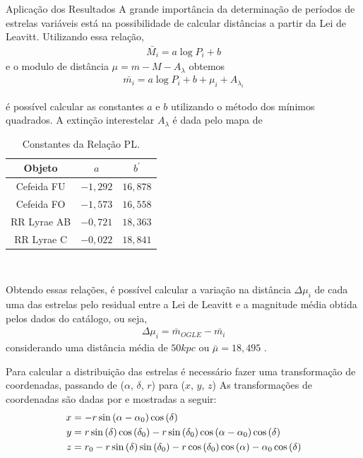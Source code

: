 \documentclass{beamer}
\begin{document}
\begin{frame}[allowframebreaks]{Aplicação dos Resultados}
A grande importância da determinação de períodos de estrelas variáveis está na possibilidade de calcular distâncias a partir da Lei de Leavitt. Utilizando essa relação,
\begin{align}
\bar{M_i} = a \log P_i + b
\end{align}
e o modulo de distância $\mu = m - M - A_\lambda$ obtemos
\begin{align}
\bar{m_i} = a \log P_i + b + \mu_i + A_{\lambda_i} \label{eq:cap4_pl}
\end{align}

é possível calcular as constantes $a$ e $b$ utilizando o método dos mínimos quadrados.
A extinção interestelar $A_\lambda$ é dada pelo mapa de \citet{Pejcha2009}

\framebreak

\begin{table}[ht]
\begin{center}
\caption{Constantes da Relação PL.}
\begin{tabular}{c|c|c}
\hline
Objeto & $a$ & $b^\prime$ \\
\hline
Cefeida FU & $-1,292$ & $16,878$ \\
Cefeida FO & $-1,573$  & $16,558$ \\
RR Lyrae AB & $-0,721$ & $18,363$\\
RR Lyrae C & $-0,022$ & $18,841$\\
\hline
\end{tabular} \\
\label{tab:pl_relacao}
\end{center}
\end{table}

\framebreak

Obtendo essas relações, é possível calcular a variação na distância $\Delta \mu_i$ de cada uma das estrelas pelo residual entre a Lei de Leavitt e a magnitude média obtida pelos dados do catálogo, ou seja,
\begin{align}
\Delta \mu_i = \bar{m}_{OGLE} - \bar{m_i}
\end{align}
considerando uma distância média de $50\si{kpc}$ ou $\bar{\mu} = 18,495$ \citep{Pejcha2009}.

\framebreak
Para calcular a distribuição das estrelas é necessário fazer uma transformação de coordenadas, passando de ($\alpha$, $\delta$, $r$) para ($x$, $y$, $z$)
As transformações de coordenadas são dadas por \citet{Deb2014} e mostradas a seguir:
\begin{align}
x &= -r \sin \left(\alpha - \alpha_0 \right) \cos \left( \delta \right) \notag \\
y &= r \sin \left( \delta \right) \cos \left( \delta_0 \right) - r \sin \left( \delta_0 \right) \cos \left( \alpha - \alpha_0 \right) \cos \left( \delta \right) \label{eq:cap4_trans}\\
z &= r_0 - r \sin \left( \delta \right) \sin \left(\delta_0 \right) - r \cos \left( \delta_0 \right) \cos \left( \alpha \right) - \alpha_0 \cos \left( \delta \right) \notag
\end{align}


\end{frame}
\end{document}
